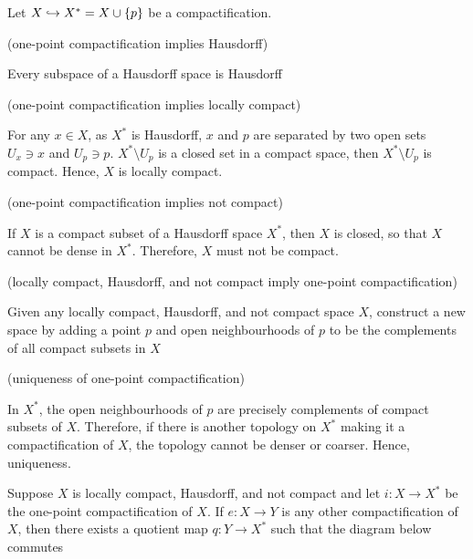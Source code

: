 \documentclass{article}
\begin{document}
\begin{longproof}

    Let $X \hookrightarrow X^* = X \cup \{p\}$ be a compactification.
    
    (one-point compactification implies Hausdorff)

    Every subspace of a Hausdorff space is Hausdorff
    
    (one-point compactification implies locally compact)

    For any $x \in X$, as $X^*$ is Hausdorff, $x$ and $p$ are separated by two open sets $U_x \ni x$ and $U_p \ni p$. $X^* \setminus U_p$ is a closed set in a compact space, then $X^* \setminus U_p$ is compact. Hence, $X$ is locally compact.  

    (one-point compactification implies not compact)

    If $X$ is a compact subset of a Hausdorff space $X^*$, then $X$ is closed, so that $X$ cannot be dense in $X^*$. Therefore, $X$ must not be compact.

    (locally compact, Hausdorff, and not compact imply one-point compactification)

    Given any locally compact, Hausdorff, and not compact space $X$, construct a new space by adding a point $p$ and open neighbourhoods of $p$ to be the complements of all compact subsets in $X$

    (uniqueness of one-point compactification)

    In $X^*$, the open neighbourhoods of $p$ are precisely complements of compact subsets of $X$. Therefore, if there is another topology on $X^*$ making it a compactification of $X$, the topology cannot be denser or coarser. Hence, uniqueness.
    
\end{longproof}

\begin{theorem}
    Suppose $X$ is locally compact, Hausdorff, and not compact and let $i: X \to X^*$ be the one-point compactification of $X$. If $e: X \to Y$ is any other compactification of $X$, then there exists a quotient map $q: Y \to X^*$ such that the diagram below commutes
    \begin{center}
    \end{center}
\end{theorem}
\end{document}
